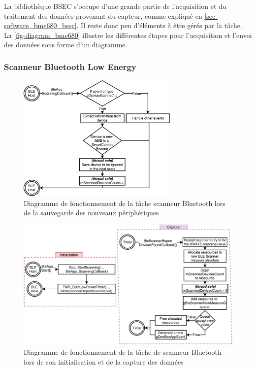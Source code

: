 La bibliothèque BSEC s'occupe d'une grande partie de l'acquisition et du traitement des données provenant du capteur, comme expliqué en \cref{sec-software_bme680_bsec}. Il reste donc peu d'éléments à être gérés par la tâche. La \cref{fig-diagram_bme680} illustre les différentes étapes pour l'acquisition et l'envoi des données sous forme d'un diagramme.



\FloatBarrier
\subsubsection{Scanneur Bluetooth Low Energy}

\begin{figure}[ht!]
    \centering
    \includegraphics[width=0.7\textwidth]{Figures/Software/diagram_blescanner_parsing.pdf}
    \caption{Diagramme de fonctionnement de la tâche scanneur Bluetooth lors de la sauvegarde des nouveaux périphériques}
    \label{fig-diagram_blescanner_parsing}
\end{figure}

\begin{figure}[ht!]
    \centering
    \includegraphics[width=1.0\textwidth]{Figures/Software/diagram_blescanner_init_acsquisition.pdf}
    \caption{Diagramme de fonctionnement de la tâche de scanneur Bluetooth lors de son initialisation et de la capture des données}
    \label{fig-diagram_blescanner_init_acsquisition}
\end{figure}

